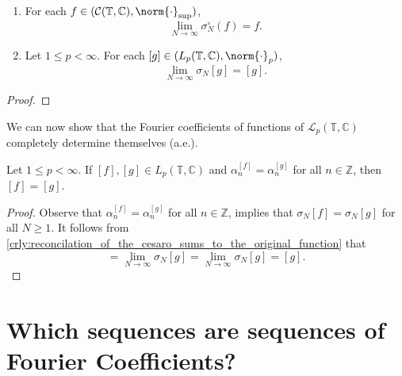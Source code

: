 \documentclass[notoc,notitlepage]{tufte-book}
\begin{document}
\begin{crly}\label{crly:reconcilation_of_the_cesaro_sums_to_the_original_function}
  \begin{enumerate}
    \item For each $f \in (\mathcal{C}(\mathbb{T}, \mathbb{C}), \norm{\cdot}_{\sup})$,
      \begin{equation*}
        \lim_{N \to \infty} \sigma_N^\circ(f) = f.
      \end{equation*}
    \item Let $1 \leq p < \infty$.
      For each $[g] \in (L_p(\mathbb{T}, \mathbb{C}), \norm{\cdot}_p)$,
      \begin{equation*}
        \lim_{N \to \infty} \sigma_N[g] = [g].
      \end{equation*}
  \end{enumerate}
\end{crly}

\begin{proof}
\end{proof}

We can now show that the Fourier coefficients of functions of
$\mathcal{L}_p(\mathbb{T}, \mathbb{C})$ completely determine themselves (a.e.).

\begin{crly}\label{crly:reconcilation_of_the_fourier_series_to_its_original_function_under_the_fejer_kernel}
  Let $1 \leq p < \infty$.  If $[f], [g] \in L_p(\mathbb{T}, \mathbb{C})$ and 
  $\alpha_n^{[f]} = \alpha_n^{[g]}$ for all $n \in \mathbb{Z}$, then $[f] = [g]$.
\end{crly}

\begin{proof}
  Observe that $\alpha_n^{[f]} = \alpha_n^{[g]}$ for all $n \in \mathbb{Z}$,
  implies that $\sigma_N[f] = \sigma_N[g]$ for all $N \geq 1$.
  It follows from
  \cref{crly:reconcilation_of_the_cesaro_sums_to_the_original_function} that
  \begin{equation*}
    [f] = \lim_{N \to \infty} \sigma_N[g] = \lim_{N \to \infty} \sigma_N[g] = [g].
  \end{equation*}
\end{proof}


\section{Which sequences are sequences of Fourier Coefficients?}%
\label{sec:which_sequences_are_sequences_of_fourier_coefficients_}
\end{document}
